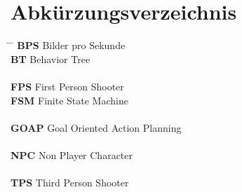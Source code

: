 \chapter*{Abkürzungsverzeichnis}

\begin{tabbing}
    \hspace{3cm} \= \hspace{8cm} \= \kill
    \textbf{BPS}  \> Bilder pro Sekunde \\
    \textbf{BT}   \> Behavior Tree \\
		\\
    \textbf{FPS}  \> First Person Shooter \\
    \textbf{FSM}  \> Finite State Machine \\
		\\
    \textbf{GOAP} \> Goal Oriented Action Planning \\
		\\
    \textbf{NPC}  \> Non Player Character \\
		\\
    \textbf{TPS}  \> Third Person Shooter \\
\end{tabbing}
